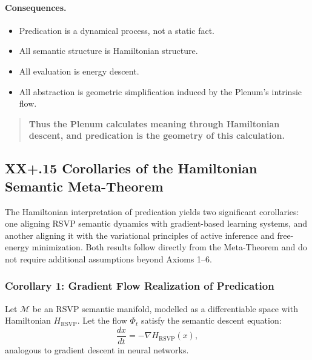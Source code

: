 \documentclass[12pt,letterpaper]{article}
\begin{document}
\paragraph{Consequences.}
\begin{itemize}
    \item Predication is a dynamical process, not a static fact.
    \item All semantic structure is Hamiltonian structure.
    \item All evaluation is energy descent.
    \item All abstraction is geometric simplification induced by the Plenum's
    intrinsic flow.
\end{itemize}

\begin{quote}
\textbf{Thus the Plenum calculates meaning through Hamiltonian descent, and
predication is the geometry of this calculation.}
\end{quote}

\subsection{XX+.15 Corollaries of the Hamiltonian Semantic Meta-Theorem}

The Hamiltonian interpretation of predication yields two significant corollaries:
one aligning RSVP semantic dynamics with gradient-based learning systems, and
another aligning it with the variational principles of active inference and
free-energy minimization.  Both results follow directly from the
Meta-Theorem and do not require additional assumptions beyond Axioms 1–6.

\subsubsection*{Corollary 1: Gradient Flow Realization of Predication}

Let $\mathcal{M}$ be an RSVP semantic manifold, modelled as a differentiable
space with Hamiltonian $H_{\mathrm{RSVP}}$.  Let the flow
$\Phi_t$ satisfy the semantic descent equation:
\[
\frac{d x}{dt} = - \nabla H_{\mathrm{RSVP}}(x),
\]
analogous to gradient descent in neural networks.
\end{document}
